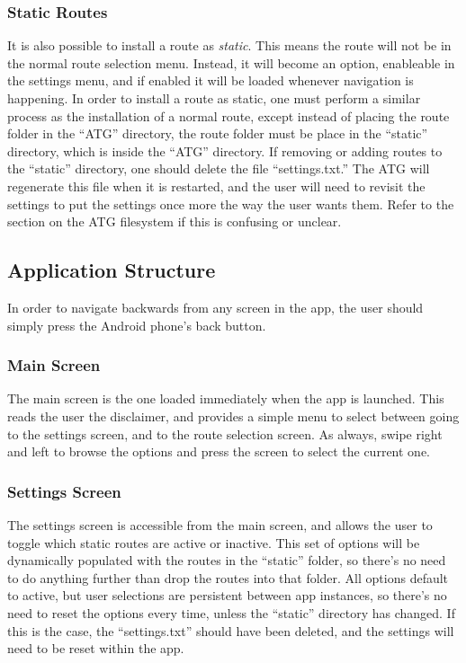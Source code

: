 \subsubsection{Static Routes}
It is also possible to install a route as \emph{static}. This means the route will not be in the normal route selection menu. Instead, it will
become an option, enableable in the settings menu, and if enabled it will be loaded whenever navigation is happening. In order to install a 
route as static, one must perform a similar process as the installation of a normal route, except instead of placing the route folder in
the ``ATG'' directory, the route folder must be place in the ``static'' directory, which is inside the ``ATG'' directory. If removing or adding
routes to the ``static'' directory, one should delete the file ``settings.txt.'' The ATG will regenerate this file when it is restarted, and
the user will need to revisit the settings to put the settings once more the way the user wants them. Refer to the section
on the ATG filesystem if this is confusing or unclear. 

\subsection{Application Structure}
In order to navigate backwards from any screen in the app, the user should simply press the Android phone's back button.
\subsubsection{Main Screen}
The main screen is the one loaded immediately when the app is launched. This reads the user the disclaimer, and provides a simple menu to
select between going to the settings screen, and to the route selection screen. As always, swipe right and left to browse the options and 
press the screen to select the current one.

\subsubsection{Settings Screen}
The settings screen is accessible from the main screen, and allows the user to toggle which static routes are active or inactive. This
set of options will be dynamically populated with the routes in the ``static'' folder, so there's no need to do anything further than drop
the routes into that folder. All options default to active, but user selections are persistent between app instances, so there's no need to
reset the options every time, unless the ``static'' directory has changed. If this is the case, the ``settings.txt'' should have been deleted,
and the settings will need to be reset within the app.


